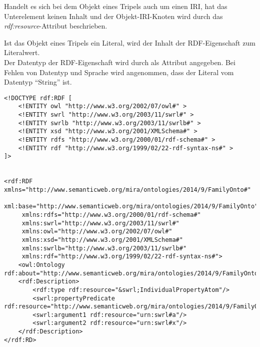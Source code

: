 Handelt es sich bei dem Objekt eines Tripels auch um einen IRI, hat das Unterelement keinen Inhalt und der Objekt-IRI-Knoten wird durch das \textit{rdf:resource}-Attribut beschrieben.

Ist das Objekt eines Tripels ein Literal, wird der Inhalt der RDF-Eigenschaft zum Literalwert.\\
Der Datentyp der RDF-Eigenschaft wird durch als Attribut angegeben. Bei Fehlen von Datentyp und Sprache wird angenommen, dass der Literal vom Datentyp ``String'' ist.

\begin{lstlisting}[caption={Beispiel RDF Elemente\protect\footnotemark}]
<!DOCTYPE rdf:RDF [
    <!ENTITY owl "http://www.w3.org/2002/07/owl#" >
    <!ENTITY swrl "http://www.w3.org/2003/11/swrl#" >
    <!ENTITY swrlb "http://www.w3.org/2003/11/swrlb#" >
    <!ENTITY xsd "http://www.w3.org/2001/XMLSchema#" >
    <!ENTITY rdfs "http://www.w3.org/2000/01/rdf-schema#" >
    <!ENTITY rdf "http://www.w3.org/1999/02/22-rdf-syntax-ns#" >
]>


<rdf:RDF xmlns="http://www.semanticweb.org/mira/ontologies/2014/9/FamilyOnto#"
     xml:base="http://www.semanticweb.org/mira/ontologies/2014/9/FamilyOnto"
     xmlns:rdfs="http://www.w3.org/2000/01/rdf-schema#"
     xmlns:swrl="http://www.w3.org/2003/11/swrl#"
     xmlns:owl="http://www.w3.org/2002/07/owl#"
     xmlns:xsd="http://www.w3.org/2001/XMLSchema#"
     xmlns:swrlb="http://www.w3.org/2003/11/swrlb#"
     xmlns:rdf="http://www.w3.org/1999/02/22-rdf-syntax-ns#">
    <owl:Ontology rdf:about="http://www.semanticweb.org/mira/ontologies/2014/9/FamilyOnto"/>
    <rdf:Description>
        <rdf:type rdf:resource="&swrl;IndividualPropertyAtom"/>
        <swrl:propertyPredicate rdf:resource="http://www.semanticweb.org/mira/ontologies/2014/9/FamilyOnto#isAncestor"/>
        <swrl:argument1 rdf:resource="urn:swrl#a"/>
        <swrl:argument2 rdf:resource="urn:swrl#x"/>
    </rdf:Description>
</rdf:RD>
\end{lstlisting}
